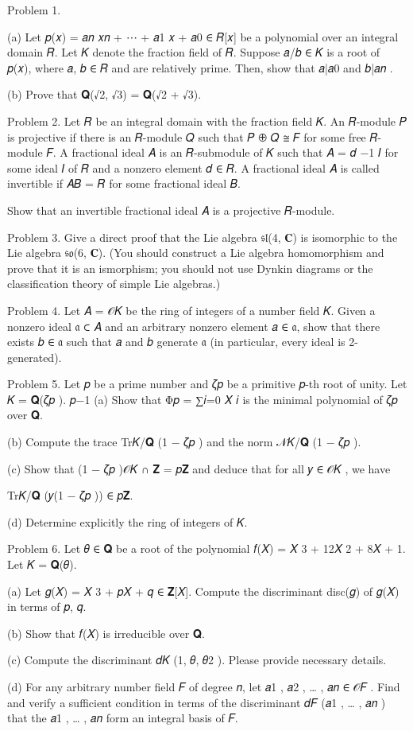 \documentclass[UTF8,12pt]{ctexart}
\begin{document}
Problem 1.

(a) Let 𝑝(𝑥) = 𝑎𝑛 𝑥𝑛 + ⋯ + 𝑎1 𝑥 + 𝑎0 ∈ 𝑅[𝑥] be a polynomial over an integral domain 𝑅. Let 𝐾 denote the fraction field of 𝑅. Suppose 𝑎/𝑏 ∈ 𝐾 is a root of 𝑝(𝑥), where 𝑎, 𝑏 ∈ 𝑅 and are relatively prime. Then, show that 𝑎|𝑎0 and 𝑏|𝑎𝑛 .

(b) Prove that 𝐐(√2, √3) = 𝐐(√2 + √3).

Problem 2. Let 𝑅 be an integral domain with the fraction field 𝐾. An 𝑅-module 𝑃 is projective if there is an 𝑅-module 𝑄 such that 𝑃 ⊕ 𝑄 ≅ 𝐹 for some free 𝑅-module 𝐹. A fractional ideal 𝐴 is an 𝑅-submodule of 𝐾 such that 𝐴 = 𝑑 −1 𝐼 for some ideal 𝐼 of 𝑅 and a nonzero element 𝑑 ∈ 𝑅. A fractional ideal 𝐴 is called invertible if 𝐴𝐵 = 𝑅 for some fractional ideal 𝐵.

Show that an invertible fractional ideal 𝐴 is a projective 𝑅-module.

Problem 3. Give a direct proof that the Lie algebra 𝔰𝔩(4, 𝐂) is isomorphic to the Lie algebra 𝔰𝔬(6, 𝐂). (You should construct a Lie algebra homomorphism and prove that it is an ismorphism; you should not use Dynkin diagrams or the classification theory of simple Lie algebras.)

Problem 4. Let 𝐴 = 𝒪𝐾 be the ring of integers of a number field 𝐾. Given a nonzero ideal 𝔞 ⊂ 𝐴 and an arbitrary nonzero element 𝑎 ∈ 𝔞, show that there exists 𝑏 ∈ 𝔞 such that 𝑎 and 𝑏 generate 𝔞 (in particular, every ideal is 2-generated).

Problem 5. Let 𝑝 be a prime number and 𝜁𝑝 be a primitive 𝑝-th root of unity. Let 𝐾 = 𝐐(𝜁𝑝 ). 𝑝−1 (a) Show that Φ𝑝 = ∑𝑖=0 𝑋 𝑖 is the minimal polynomial of 𝜁𝑝 over 𝐐.

(b) Compute the trace Tr𝐾/𝐐 (1 − 𝜁𝑝 ) and the norm 𝒩𝐾/𝐐 (1 − 𝜁𝑝 ).

(c) Show that (1 − 𝜁𝑝 )𝒪𝐾 ∩ 𝐙 = 𝑝𝐙 and deduce that for all 𝑦 ∈ 𝒪𝐾 , we have

Tr𝐾/𝐐 (𝑦(1 − 𝜁𝑝 )) ∈ 𝑝𝐙.

(d) Determine explicitly the ring of integers of 𝐾.

Problem 6. Let 𝜃 ∈ 𝐐 be a root of the polynomial 𝑓(𝑋) = 𝑋 3 + 12𝑋 2 + 8𝑋 + 1. Let 𝐾 = 𝐐(𝜃).

(a) Let 𝑔(𝑋) = 𝑋 3 + 𝑝𝑋 + 𝑞 ∈ 𝐙[𝑋]. Compute the discriminant disc(𝑔) of 𝑔(𝑋) in terms of 𝑝, 𝑞.

(b) Show that 𝑓(𝑋) is irreducible over 𝐐.

(c) Compute the discriminant 𝑑𝐾 (1, 𝜃, 𝜃2 ). Please provide necessary details.

(d) For any arbitrary number field 𝐹 of degree 𝑛, let 𝑎1 , 𝑎2 , … , 𝑎𝑛 ∈ 𝒪𝐹 . Find and verify a sufficient condition in terms of the discriminant 𝑑𝐹 (𝑎1 , … , 𝑎𝑛 ) that the 𝑎1 , … , 𝑎𝑛 form an integral basis of 𝐹.
\end{document}
